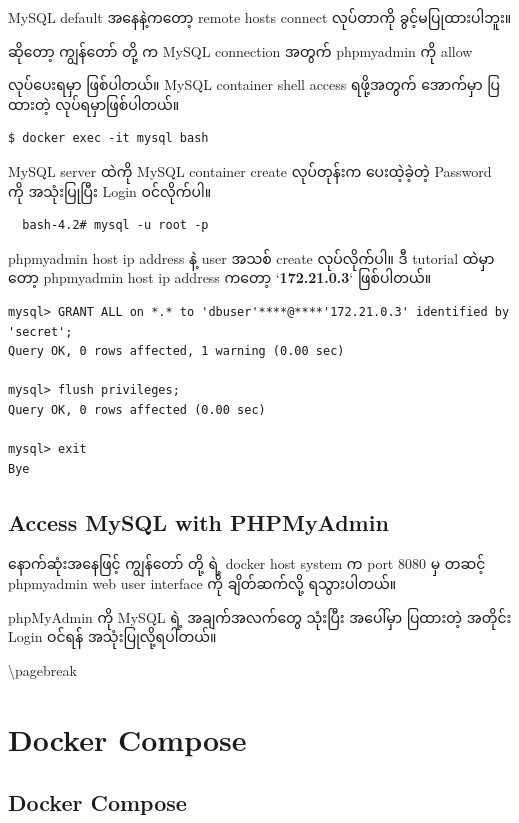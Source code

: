 MySQL default အနေနဲ့ကတော့ remote hosts connect လုပ်တာကို
ခွင့်မပြုထားပါဘူး။

ဆိုတော့ ကျွန်တော် တို့ က MySQL connection အတွက် phpmyadmin ကို allow

လုပ်ပေးရမှာ ဖြစ်ပါတယ်။ MySQL container shell access ရဖို့အတွက် အောက်မှာ
ပြထားတဲ့ လုပ်ရမှာဖြစ်ပါတယ်။

\begin{verbatim}
$ docker exec -it mysql bash
\end{verbatim}

MySQL server ထဲကို MySQL container create လုပ်တုန်းက ပေးထဲ့ခဲ့တဲ့
Password ကို အသုံးပြုပြီး Login ဝင်လိုက်ပါ။

\begin{verbatim}
  bash-4.2# mysql -u root -p
\end{verbatim}

phpmyadmin host ip address နဲ့ user အသစ် create လုပ်လိုက်ပါ။ ဒီ tutorial
ထဲမှာတော့ phpmyadmin host ip address ကတော့ `\textbf{172.21.0.3}`
ဖြစ်ပါတယ်။

\begin{verbatim}
mysql> GRANT ALL on *.* to 'dbuser'****@****'172.21.0.3' identified by 'secret';
Query OK, 0 rows affected, 1 warning (0.00 sec)

mysql> flush privileges;
Query OK, 0 rows affected (0.00 sec)

mysql> exit
Bye
\end{verbatim}

\subsection{Access MySQL with
PHPMyAdmin}\label{access-mysql-with-phpmyadmin}

နောက်ဆုံးအနေဖြင့် ကျွန်တော် တို့ ရဲ့ docker host system က port 8080 မှ
တဆင့် phpmyadmin web user interface ကို ချိတ်ဆက်လို့ ရသွားပါတယ်။

phpMyAdmin ကို MySQL ရဲ့ အချက်အလက်တွေ သုံးပြီး အပေါ်မှာ ပြထားတဲ့ အတိုင်း
Login ဝင်ရန် အသုံးပြုလို့ရပါတယ်။

\textbackslash{}pagebreak

\section{Docker Compose}\label{docker-compose}

\subsection{Docker Compose}\label{docker-compose-1}

